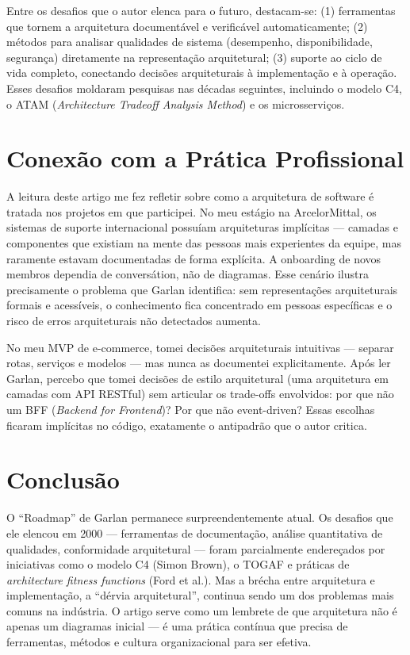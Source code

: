 \documentclass[12pt,a4paper]{article}
\begin{document}
Entre os desafios que o autor elenca para o futuro, destacam-se: (1) ferramentas
que tornem a arquitetura document\'avel e verific\'avel automaticamente;
(2) m\'etodos para analisar qualidades de sistema (desempenho, disponibilidade,
segurança) diretamente na representa\c{c}\~ao arquitetural; (3) suporte ao ciclo
de vida completo, conectando decis\~oes arquiteturais \`a implementa\c{c}\~ao e
\`a opera\c{c}\~ao. Esses desafios moldaram pesquisas nas d\'ecadas seguintes,
incluindo o modelo C4, o ATAM (\textit{Architecture Tradeoff Analysis Method})
e os microsservi\c{c}os.

\section{Conex\~ao com a Pr\'atica Profissional}

A leitura deste artigo me fez refletir sobre como a arquitetura de software \'e
tratada nos projetos em que participei. No meu est\'agio na ArcelorMittal, os
sistemas de suporte internacional possu\'iam arquiteturas impl\'icitas ---
camadas e componentes que existiam na mente das pessoas mais experientes da equipe,
mas raramente estavam documentadas de forma expl\'icita. A onboarding de novos
membros dependia de convers\'ation, n\~ao de diagramas. Esse cenário ilustra
precisamente o problema que Garlan identifica: sem representa\c{c}\~oes arquiteturais
formais e acess\'iveis, o conhecimento fica concentrado em pessoas espec\'ificas
e o risco de erros arquiteturais n\~ao detectados aumenta.

No meu MVP de e-commerce, tomei decis\~oes arquiteturais intuitivas --- separar
rotas, servi\c{c}os e modelos --- mas nunca as documentei explicitamente. Ap\'os
ler Garlan, percebo que tomei decis\~oes de estilo arquitetural (uma arquitetura
em camadas com API RESTful) sem articular os trade-offs envolvidos: por que n\~ao
um BFF (\textit{Backend for Frontend})? Por que n\~ao event-driven? Essas escolhas
ficaram impl\'icitas no c\'odigo, exatamente o antipadr\~ao que o autor critica.

\section{Conclus\~ao}

O ``Roadmap'' de Garlan permanece surpreendentemente atual. Os desafios que ele
elencou em 2000 --- ferramentas de documenta\c{c}\~ao, an\'alise quantitativa de
qualidades, conformidade arquitetural --- foram parcialmente endereçados por
iniciativas como o modelo C4 (Simon Brown), o TOGAF e pr\'aticas de
\textit{architecture fitness functions} (Ford et al.). Mas a br\'echa entre
arquitetura e implementa\c{c}\~ao, a ``d\'ervia arquitetural'', continua sendo
um dos problemas mais comuns na ind\'ustria. O artigo serve como um lembrete de
que arquitetura n\~ao \'e apenas um diagramas inicial --- \'e uma pr\'atica
cont\'inua que precisa de ferramentas, m\'etodos e cultura organizacional para
ser efetiva.
\end{document}
